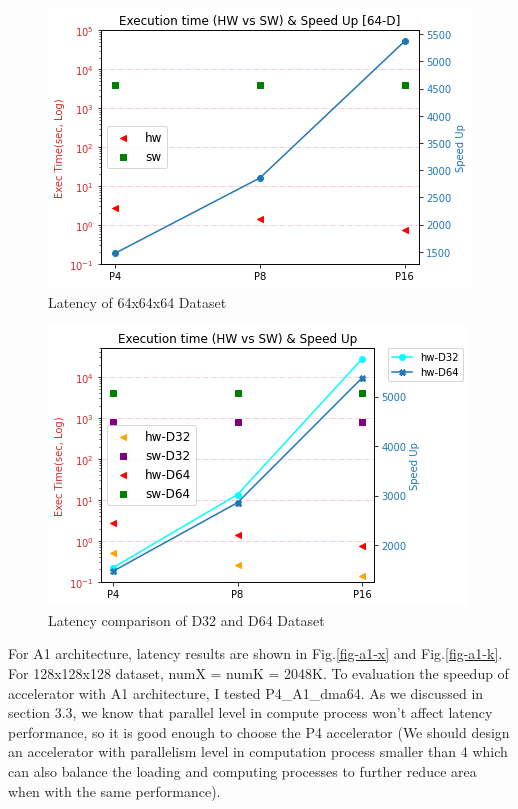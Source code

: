 \documentclass{sig-alternate}
\begin{document}
\begin{figure}[h!]
    \centering
    \includegraphics[width=0.85\columnwidth]{figure/D64-SW-HW.png}
    \caption{Latency of 64x64x64 Dataset}
    \label{fig-d64}
\end{figure}

\begin{figure}[h!]
    \centering
    \includegraphics[width=0.85\columnwidth]{figure/D32-D64-HW-SW.png}
    \caption{Latency comparison of D32 and D64 Dataset}
    \label{fig-d32-64}
\end{figure}

For A1 architecture, latency results are shown in Fig.\ref{fig-a1-x} and Fig.\ref{fig-a1-k}. For 128x128x128 dataset, numX = numK = 2048K. To evaluation the speedup of accelerator with A1 architecture, I tested P4\_A1\_dma64. As we discussed in section 3.3, we know that parallel level in compute process won't affect latency performance, so it is good enough to choose the P4 accelerator (We should design an accelerator with parallelism level in computation process smaller than 4 which can also balance the loading and computing processes to further reduce area when with the same performance).
\end{document}
